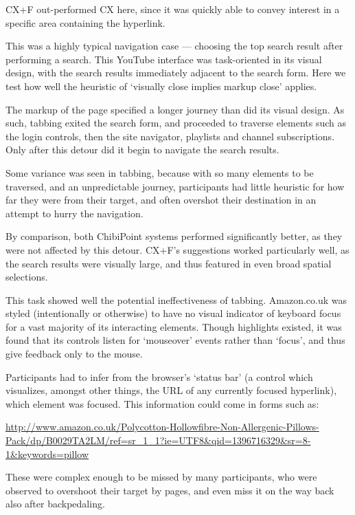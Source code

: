 \documentclass[11pt,openright,a4paper]{report}
\begin{document}
CX+F out-performed CX here, since it was quickly able to convey interest in a specific area containing the hyperlink.

This was a highly typical navigation case --- choosing the top search result after performing a search. This YouTube interface was task-oriented in its visual design, with the search results immediately adjacent to the search form. Here we test how well the heuristic of `visually close implies markup close' applies.

The markup of the page specified a longer journey than did its visual design. As such, tabbing exited the search form, and proceeded to traverse elements such as the login controls, then the site navigator, playlists and channel subscriptions. Only after this detour did it begin to navigate the search results.

Some variance was seen in tabbing, because with so many elements to be traversed, and an unpredictable journey, participants had little heuristic for how far they were from their target, and often overshot their destination in an attempt to hurry the navigation.

By comparison, both ChibiPoint systems performed significantly better, as they were not affected by this detour. CX+F's suggestions worked particularly well, as the search results were visually large, and thus featured in even broad spatial selections.

This task showed well the potential ineffectiveness of tabbing. Amazon.co.uk was styled (intentionally or otherwise) to have no visual indicator of keyboard focus for a vast majority of its interacting elements. Though highlights existed, it was found that its controls listen for `mouseover' events rather than `focus', and thus give feedback only to the mouse.

Participants had to infer from the browser's `status bar' (a control which visualizes, amongst other things, the URL of any currently focused hyperlink), which element was focused. This information could come in forms such as:

{\raggedright{}\url{http://www.amazon.co.uk/Polycotton-Hollowfibre-Non-Allergenic-Pillows-Pack/dp/B0029TA2LM/ref=sr_1_1?ie=UTF8&qid=1396716329&sr=8-1&keywords=pillow}}

These were complex enough to be missed by many participants, who were observed to overshoot their target by pages, and even miss it on the way back also after backpedaling.
\end{document}
